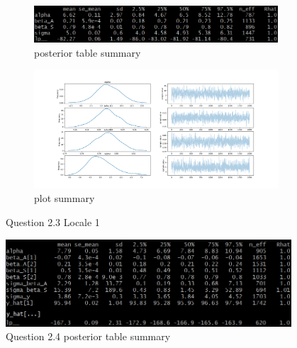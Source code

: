 \documentclass[11pt,a4paper,titlepage]{article}
\begin{document}
\begin{appendices}
    \begin{figure}[htb]
      \centering
      \begin{subfigure}[b]{\textwidth}
        \centering
        \includegraphics[width=\textwidth]{../q23/q23_table_summary_L1.png}
        \caption{posterior table summary}
      \end{subfigure}
      \hfill
      \begin{subfigure}[b]{\textwidth}
        \centering
        \includegraphics[width=\textwidth]{../q23/q23_plot_summary_L1.png}
        \caption{plot summary}
      \end{subfigure}
      \caption{Question 2.3 Locale 1}
      \label{fig:2.3_1}
    \end{figure}

    \begin{figure}[htb]
      \centering
        \includegraphics[width=0.95\textwidth]{../q24/q24_table_summary.png}
        \caption{Question 2.4 posterior table summary}
      \label{tab:2.4}
    \end{figure}


\end{appendices}
\end{document}
